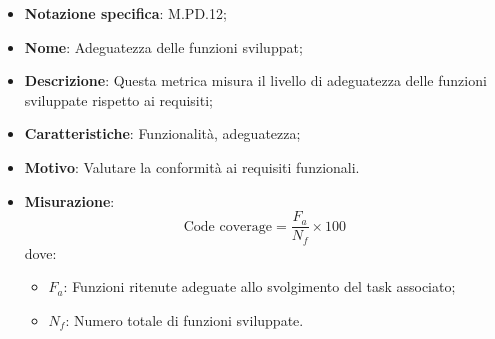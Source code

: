 \begin{itemize}
    \item \textbf{Notazione specifica}: M.PD.12;
    \item \textbf{Nome}: Adeguatezza delle funzioni sviluppat;
    \item \textbf{Descrizione}: Questa metrica misura il livello di adeguatezza delle funzioni sviluppate rispetto ai requisiti;
    \item \textbf{Caratteristiche}: Funzionalità, adeguatezza;
    \item \textbf{Motivo}: Valutare la conformità ai requisiti funzionali.
    \item \textbf{Misurazione}: 
    \[
    \text{Code coverage} = \frac{F_{a}}{N_{f}} \times 100
    \]
    dove:
    \begin{itemize}
        \item $F_{a}$: Funzioni ritenute adeguate allo svolgimento del task associato;
        \item $N_{f}$: Numero totale di funzioni sviluppate.
    \end{itemize}
\end{itemize}
